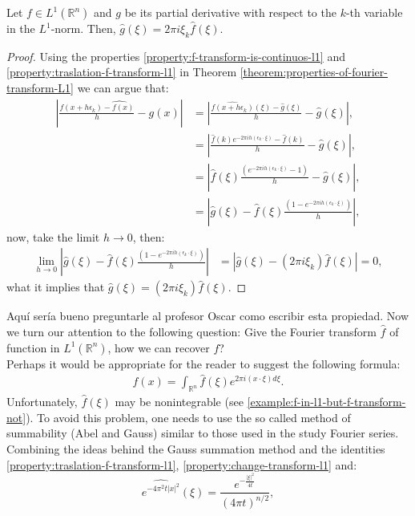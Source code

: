 \begin{theorem}{}
  Let $f\in L^1(\mathbb{R}^{n})$ and $g$ be its partial derivative with respect to the $k$-th variable in the $L^1$-norm. Then, $\hat{g}(\xi)=2\pi i\xi_k\hat{f}(\xi)$.
\end{theorem}
\begin{proof} 
  Using the properties \cref{property:f-transform-is-continuos-l1} and \cref{property:traslation-f-transform-l1} in Theorem \cref{theorem:properties-of-fourier-transform-L1} we can argue that:
  \begin{align*}
    \left| \hat{\frac{f(x+h\epsilon_k)-f(x)}{h}-g(x)} \right|&=\left| \frac{\hat{f(x+h\epsilon_k)}(\xi)-\hat{g}(\xi)}{h}-\hat{g}(\xi) \right|,\\
    &=\left| \frac{\hat{f}(k)e^{-2\pi ih(\epsilon_k\cdot \xi)}-\hat{f}(k)}{h}-\hat{g}(\xi) \right|,\\
    &=\left| \hat{f}(\xi)\frac{(e^{-2\pi ih(\epsilon_k\cdot \xi)}-1)}{h}-\hat{g}(\xi) \right|,\\
    &=\left| \hat{g}(\xi)-\hat{f}(\xi)\frac{(1-e^{-2\pi ih(\epsilon_k\cdot\xi)})}{h} \right|,
  \end{align*}
  now, take the limit $h\to 0$, then:
  \begin{align*}
    \lim_{h \rightarrow 0}\left| \hat{g}(\xi)-\hat{f}(\xi)\frac{(1-e^{-2\pi ih(\epsilon_k\cdot\xi)})}{h} \right|&=\left| \hat{g}(\xi)-(2\pi i\xi_k)\hat{f}(\xi) \right|=0,
  \end{align*}
  what it implies that $\hat{g}(\xi)=(2\pi i\xi_k)\hat{f}(\xi)$.
\end{proof}
Aquí sería bueno preguntarle al profesor Oscar como escribir esta propiedad.
Now we turn our attention to the following question: Give the Fourier transform $\hat{f}$ of function in $L^1(\mathbb{R}^{n})$, how we can recover $f$?\\
Perhaps it would be appropriate for the reader to suggest the following formula:
\begin{align*}
  f(x)=\int_{\mathbb{R}^{n}}\hat{f}(\xi)e^{2\pi i(x\cdot \xi)d\xi}.
\end{align*}
Unfortunately, $\hat{f}(\xi)$ may be nonintegrable (see \cref{example:f-in-l1-but-f-transform-not}). To avoid this problem, one needs to use the so called method of summability (Abel and Gauss) similar to those used in the study Fourier series. Combining the ideas behind the Gauss summation method and the identities \cref{property:traslation-f-transform-l1}, \cref{property:change-transform-l1} and:
\begin{equation}
  \hat{e^{-4\pi^2t|x|^2}}(\xi)=\frac{e^{-\frac{|\xi|^2}{4t}}}{(4\pi t)^{n/2}},
\end{equation}
